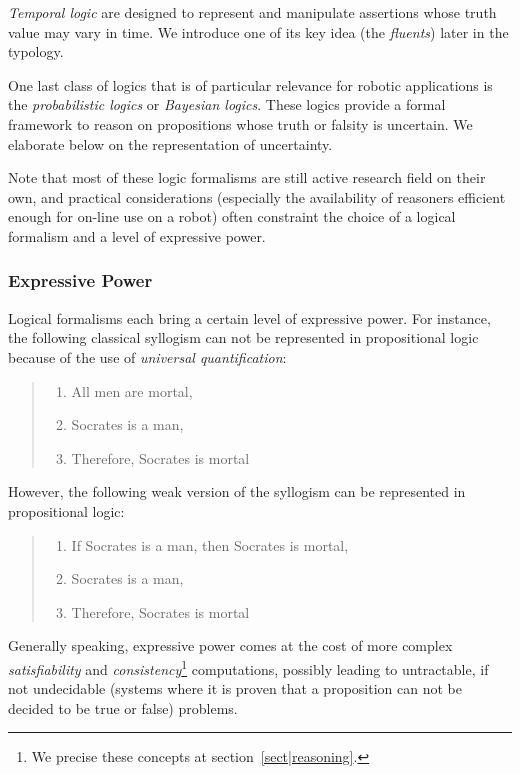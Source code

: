 \emph{Temporal logic} are designed to represent and manipulate assertions whose
truth value may vary in time. We introduce one of its key idea (the
\emph{fluents}) later in the typology.

One last class of logics that is of particular relevance for robotic
applications is the \emph{probabilistic logics} or \emph{Bayesian logics}.
These logics provide a formal framework to reason on propositions whose truth
or falsity is uncertain. We elaborate below on the representation of uncertainty.

Note that most of these logic formalisms are still active research field on
their own, and practical considerations (especially the availability of
reasoners efficient enough for on-line use on a robot) often constraint the
choice of a logical formalism and a level of expressive power.

\subsubsection{Expressive Power}

Logical formalisms each bring a certain level of expressive power. For
instance, the following classical syllogism can not be represented in
propositional logic because of the use of \emph{universal quantification}:

\begin{quote}
\begin{enumerate}
    \item All men are mortal,
    \item Socrates is a man,
    \item Therefore, Socrates is mortal
\end{enumerate}
\end{quote}

However, the following weak version of the syllogism can be represented in
propositional logic:

\begin{quote}
\begin{enumerate}
    \item If Socrates is a man, then Socrates is mortal,
    \item Socrates is a man,
    \item Therefore, Socrates is mortal
\end{enumerate}
\end{quote}

Generally speaking, expressive power comes at the cost of more complex
\emph{satisfiability} and \emph{consistency}\footnote{We precise these concepts
at section~\ref{sect|reasoning}.} computations, possibly leading to
untractable, if not undecidable (\ie systems where it is proven that a
proposition can not be decided to be true or false) problems.

